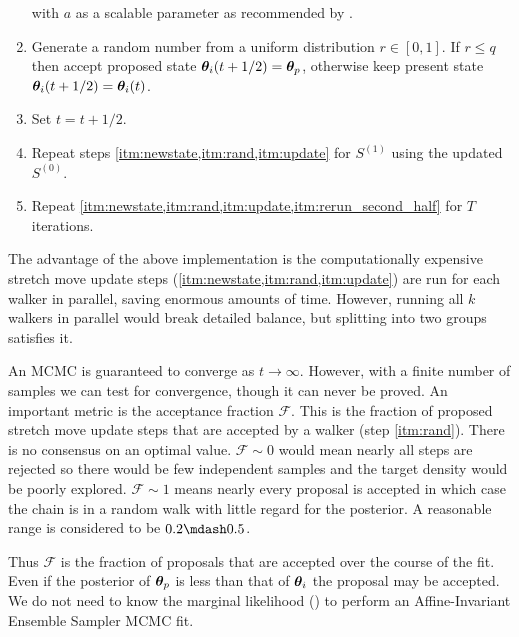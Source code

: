 \begin{enumerate}
\noindent with $a$ as a scalable parameter as recommended by .

\item \label{itm:rand} Generate a random number from a uniform distribution $r \in [0, 1]$.  If $r \leq q$ then accept proposed state
$\boldsymbol{\theta}_i(t + 1/2) = \boldsymbol{\theta}_p$, otherwise keep present state $\boldsymbol{\theta}_i(t + 1/2) = \boldsymbol{\theta}_i(t)$.

\item \label{itm:update}  Set $t = t + 1/2$.

\item \label{itm:rerun_second_half} Repeat steps \cref{itm:newstate,itm:rand,itm:update} for $S^{(1)}$ using the updated $S^{(0)}$.

\item Repeat \cref{itm:newstate,itm:rand,itm:update,itm:rerun_second_half} for $T$ iterations.
\end{enumerate}

The advantage of the above implementation is the computationally expensive stretch move update steps
(\cref{itm:newstate,itm:rand,itm:update}) are run
for each walker in parallel, saving enormous amounts of time.  However, running all $k$ walkers in parallel would break detailed balance,
but splitting into two groups satisfies it.

An MCMC is guaranteed to converge as $t \rightarrow \infty$.  However, with a finite number of samples we can test for convergence,
though it can never be proved.  An important metric is the acceptance fraction
$\mathcal{F}$.  This is the fraction of proposed stretch move update steps that are accepted by a walker (step \cref{itm:rand}).  There is
no consensus on an optimal value.  $\mathcal{F} \sim 0$ would mean nearly all steps are rejected so there would be few independent samples
and the target density would be poorly explored.  $\mathcal{F} \sim 1$ means nearly every proposal is accepted in which case
the chain is in a random walk with little regard for the posterior.  A reasonable range is considered to be $0.2 \mdash 0.5$.

Thus $\mathcal{F}$ is
the fraction of proposals that are accepted over the course of the fit.  Even if the posterior of $\boldsymbol{\theta}_p$ is less than
that of $\boldsymbol{\theta}_i$ the proposal may be accepted.  We do not need to know the marginal
likelihood () to perform an Affine-Invariant Ensemble Sampler MCMC
fit.

